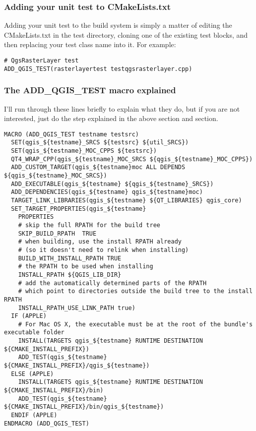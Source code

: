 \subsubsection{Adding your unit test to CMakeLists.txt}
Adding your unit test to the build system is simply a matter of editing the
CMakeLists.txt in the test directory, cloning one of the existing test blocks,
and then replacing your test class name into it.  For example:

\begin{verbatim}
# QgsRasterLayer test
ADD_QGIS_TEST(rasterlayertest testqgsrasterlayer.cpp)
\end{verbatim}

\subsubsection{The ADD\_QGIS\_TEST macro explained}
I'll run through these lines briefly to explain what they do, but if you are
not interested, just do the step explained in the above section and section.

\begin{verbatim}
MACRO (ADD_QGIS_TEST testname testsrc)
  SET(qgis_${testname}_SRCS ${testsrc} ${util_SRCS})
  SET(qgis_${testname}_MOC_CPPS ${testsrc})
  QT4_WRAP_CPP(qgis_${testname}_MOC_SRCS ${qgis_${testname}_MOC_CPPS})
  ADD_CUSTOM_TARGET(qgis_${testname}moc ALL DEPENDS ${qgis_${testname}_MOC_SRCS})
  ADD_EXECUTABLE(qgis_${testname} ${qgis_${testname}_SRCS})
  ADD_DEPENDENCIES(qgis_${testname} qgis_${testname}moc)
  TARGET_LINK_LIBRARIES(qgis_${testname} ${QT_LIBRARIES} qgis_core)
  SET_TARGET_PROPERTIES(qgis_${testname}
    PROPERTIES
    # skip the full RPATH for the build tree
    SKIP_BUILD_RPATH  TRUE
    # when building, use the install RPATH already
    # (so it doesn't need to relink when installing)
    BUILD_WITH_INSTALL_RPATH TRUE
    # the RPATH to be used when installing
    INSTALL_RPATH ${QGIS_LIB_DIR}
    # add the automatically determined parts of the RPATH
    # which point to directories outside the build tree to the install RPATH
    INSTALL_RPATH_USE_LINK_PATH true)
  IF (APPLE)
    # For Mac OS X, the executable must be at the root of the bundle's executable folder
    INSTALL(TARGETS qgis_${testname} RUNTIME DESTINATION ${CMAKE_INSTALL_PREFIX})
    ADD_TEST(qgis_${testname} ${CMAKE_INSTALL_PREFIX}/qgis_${testname})
  ELSE (APPLE)
    INSTALL(TARGETS qgis_${testname} RUNTIME DESTINATION ${CMAKE_INSTALL_PREFIX}/bin)
    ADD_TEST(qgis_${testname} ${CMAKE_INSTALL_PREFIX}/bin/qgis_${testname})
  ENDIF (APPLE)
ENDMACRO (ADD_QGIS_TEST)
\end{verbatim}

